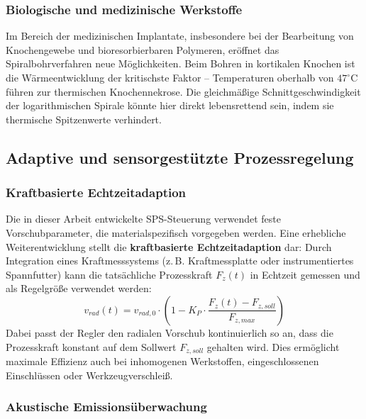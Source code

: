 ﻿\documentclass[12pt,a4paper]{article}
\begin{document}
\subsubsection{Biologische und medizinische Werkstoffe}

Im Bereich der medizinischen Implantate, insbesondere bei der Bearbeitung von Knochengewebe und bioresorbierbaren Polymeren, eröffnet das Spiralbohrverfahren neue Möglichkeiten. Beim Bohren in kortikalen Knochen ist die Wärmeentwicklung der kritischste Faktor -- Temperaturen oberhalb von $47^\circ\text{C}$ führen zur thermischen Knochennekrose. Die gleichmäßige Schnittgeschwindigkeit der logarithmischen Spirale könnte hier direkt lebensrettend sein, indem sie thermische Spitzenwerte verhindert.

\subsection{Adaptive und sensorgestützte Prozessregelung}

\subsubsection{Kraftbasierte Echtzeitadaption}

Die in dieser Arbeit entwickelte SPS-Steuerung verwendet feste Vorschubparameter, die materialspezifisch vorgegeben werden. Eine erhebliche Weiterentwicklung stellt die \textbf{kraftbasierte Echtzeitadaption} dar: Durch Integration eines Kraftmesssystems (z.\,B. Kraftmessplatte oder instrumentiertes Spannfutter) kann die tatsächliche Prozesskraft $F_z(t)$ in Echtzeit gemessen und als Regelgröße verwendet werden:
\begin{equation}
    v_{rad}(t) = v_{rad,0} \cdot \left(1 - K_P \cdot \frac{F_z(t) - F_{z,soll}}{F_{z,max}}\right)
\end{equation}
Dabei passt der Regler den radialen Vorschub kontinuierlich so an, dass die Prozesskraft konstant auf dem Sollwert $F_{z,soll}$ gehalten wird. Dies ermöglicht maximale Effizienz auch bei inhomogenen Werkstoffen, eingeschlossenen Einschlüssen oder Werkzeugverschleiß.

\subsubsection{Akustische Emissionsüberwachung}
\end{document}
